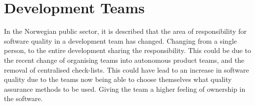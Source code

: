 



\section{Development Teams}
In the Norwegian public sector, it is described that the area of responsibility for software quality in a development team has changed. Changing from a single person, to the entire development sharing the responsibility. This could be due to the recent change of organising teams into autonomous product teams, and the removal of centralised check-lists. This could have lead to an increase in software quality due to the teams now being able to choose themselves what quality assurance methods to be used. Giving the team a higher feeling of ownership in the software.

